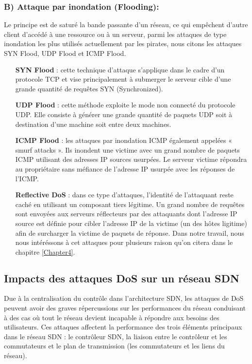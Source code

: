 \subsubsection{B) Attaque par inondation (Flooding):}
Le principe est de saturé la bande passante d’un réseau, ce qui empêchent d’autre client d’accédé à une ressource ou à un serveur, parmi les attaques de type inondation les plus utilisés actuellement par les pirates, nous citons les attaques SYN Flood, UDP Flood et ICMP Flood.\\
\begin{itemize}
\item[\textbf{SYN Flood}]: cette technique d’attaque s’applique dans le cadre d’un protocole TCP et vise principalement à submerger le serveur cible d’une grande quantité de requêtes SYN (Synchronized).\\
\item[\textbf{UDP Flood}]: cette méthode exploite le mode non connecté du protocole UDP. Elle consiste à générer une grande quantité de paquets UDP soit à destination d’une machine soit entre deux machines.\\
\item[\textbf{ICMP Flood}]: les attaques par inondation ICMP également appelées « smurf attacks ». Ils inondent une victime avec un grand nombre de paquets ICMP utilisant des adresses IP sources usurpées. Le serveur victime répondra au propriétaire sans méfiance de l'adresse IP usurpée avec les réponses de l'ICMP.\\
\item[\textbf{Reflective DoS}]: dans ce type d’attaques, l’identité de l’attaquant reste caché en utilisant un composant tiers légitime. Un grand nombre de requêtes sont envoyées aux serveurs réflecteurs par des attaquants dont l’adresse IP source est définie pour cibler l’adresse IP de la victime (un des hôtes ligitime) afin de surcharger la victime de paquets de réponse. Dans notre travail, nous nous intéréssons à cet attaques pour plusieurs raison qu'on citera dans le chapitre \ref{Chapter4}.
\end{itemize}
\newpage
\subsection{Impacts des attaques DoS sur un réseau SDN}
Due à la centralisation du contrôle dans l’architecture SDN, les attaques de DoS peuvent avoir des graves répercussions sur les performances du réseau conduisant à des cas où tout le réseau devient incapable à répondre aux besoins des utilisateurs. Ces attaques affectent la performance des trois éléments principaux dans le réseau SDN : le contrôleur SDN, la liaison entre le contrôleur et les commutateurs et le plan de transmission (les commutateurs et les liens du réseau).

